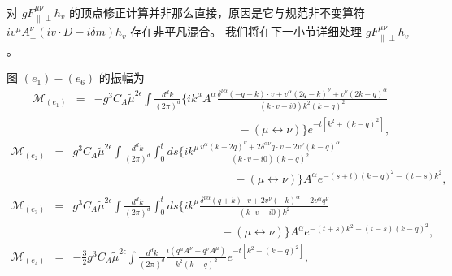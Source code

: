 对 $gF^{\mu\nu}_{\|\perp}h_v$ 的顶点修正计算并非那么直接，原因是它与规范非不变算符 $iv^{\mu}A_{\perp}^{\nu}(iv\cdot D - i\delta m) h_v$ 存在非平凡混合。
我们将在下一小节详细处理 $gF^{\mu\nu}_{\|\perp}h_v$。

图 $(e_1) - (e_6)$ 的振幅为
\begin{eqnarray}
\label{eq:e1}
\mathcal{M}_{(e_1)}
&=&-g^3C_A\tilde{\mu}^{2\epsilon}\int\frac{d^dk}{(2\pi)^d}\bigg\{ik^{\mu}A^{\alpha}\frac{\delta^{\nu\alpha}\left(-q-k\right)\cdot v+v^{\alpha}\left(2q-k\right)^{\nu}+v^{\nu}\left(2k-q\right)^{\alpha}}{(k\cdot v- i0)k^2(k-q)^2}\nonumber\\
&&\, \, \, \, \, \, \, \, \, \, \, \, \, \, \, \, \, \, \, \, \, \, \, \, \, \, \, \, \, \, \, \, \, \, \, \, \, \, \, \, \, \, \, \, \, \, \, \, \, \, \, \, \, \, \, \, \, \, \, \, \, \, \, \, \,  \, \, \, \, \, \, \, \, \, \, \, -\left(\mu\leftrightarrow\nu\right)\bigg\}e^{-t\left[k^2+(k-q)^2\right]},
\end{eqnarray}
\begin{eqnarray}
\label{eq:e2}
\mathcal{M}_{(e_2)}
&=&g^3C_A\tilde{\mu}^{2\epsilon}\int\frac{d^dk}{(2\pi)^d}\int_0^t ds\bigg\{ik^{\mu}\frac{v^{\alpha}\left(k-2q\right)^{\nu}+2\delta^{\alpha \nu}q\cdot v-2v^{\nu}(k-q)^{\alpha}}{(k\cdot v- i0)(k-q)^2}\nonumber\\
&&\, \, \, \, \, \, \, \, \, \, \, \, \, \, \, \, \, \, \, \, \, \, \, \, \, \, \, \, \, \, \, \, \, \, \, \, \, \, \, \, \, \, \, \, \, \, \, \, \, \, \, \, \, \, \, \, \, \, \, \, \, \, \, \, \, \, \, \, \,  \, \, \, \, \, \, \, \, \, \, \, \, \, \, \, \, -\left(\mu\leftrightarrow\nu\right)\bigg\}A^{\alpha}e^{-(s+t)(k-q)^2-(t-s)k^2},\\\nonumber\\
\label{eq:e3}
\mathcal{M}_{(e_3)}
&=&g^3C_A\tilde{\mu}^{2\epsilon}\int\frac{d^dk}{(2\pi)^d}\int_0^t ds\bigg\{ik^{\mu}\frac{\delta^{\nu\alpha}\left(q+k\right)\cdot v+2v^{\nu}(-k)^{\alpha}-2v^{\alpha}q^{\nu}}{(k\cdot v- i0)k^2}\nonumber\\
&&\, \, \, \, \, \, \, \, \, \, \, \, \, \, \, \, \, \, \, \, \, \, \, \, \, \, \, \, \, \, \, \, \, \, \, \, \, \, \, \, \, \, \, \, \, \, \, \, \, \, \, \, \, \, \, \, \, \, \, \, \, \, \, \, \, \, \, \, \, \, \, \, \, \, \, \, \, \,  -\left(\mu\leftrightarrow\nu\right)\bigg\}A^{\alpha}e^{-(t+s)k^2-(t-s)(k-q)^2},\\
\label{eq:e4}
\mathcal{M}_{(e_4)}
&=&-\frac{3}{2}g^3C_A\tilde{\mu}^{2\epsilon}\int\frac{d^dk}{(2\pi)^d } \frac{i\left(q^{\mu}A^{\nu}-q^{\nu}A^{\mu}\right)}{k^2(k-q)^2}e^{-t\left[k^2+(k-q)^2\right]},
\end{eqnarray}
